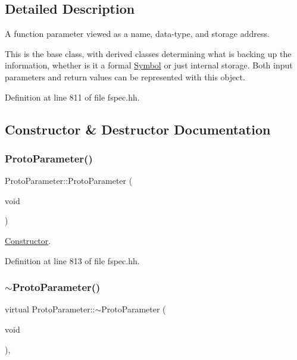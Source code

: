 \subsection{Detailed Description}
A function parameter viewed as a name, data-\/type, and storage address. 

This is the base class, with derived classes determining what is backing up the information, whether is it a formal \mbox{\hyperlink{class_symbol}{Symbol}} or just internal storage. Both input parameters and return values can be represented with this object. 

Definition at line 811 of file fspec.\+hh.



\subsection{Constructor \& Destructor Documentation}
\mbox{\label{class_proto_parameter_a60a3aefc8f1ddf935990d4c9e6cc1367}} 
\subsubsection{\texorpdfstring{ProtoParameter()}{ProtoParameter()}}
{\footnotesize\ttfamily Proto\+Parameter\+::\+Proto\+Parameter (\begin{DoxyParamCaption}\item[{void}]{ }\end{DoxyParamCaption})\hspace{0.3cm}{\ttfamily [inline]}}



\mbox{\hyperlink{class_constructor}{Constructor}}. 



Definition at line 813 of file fspec.\+hh.

\mbox{\label{class_proto_parameter_a63533cc17e94e8b022414ca5b03a101e}} 
\subsubsection{\texorpdfstring{$\sim$ProtoParameter()}{~ProtoParameter()}}
{\footnotesize\ttfamily virtual Proto\+Parameter\+::$\sim$\+Proto\+Parameter (\begin{DoxyParamCaption}\item[{void}]{ }\end{DoxyParamCaption})\hspace{0.3cm}{\ttfamily [inline]}, {\ttfamily [virtual]}}



